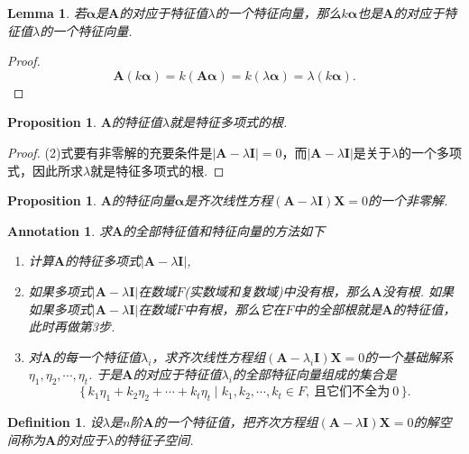 \documentclass{article}
\newtheorem{lemma}[theorem]{Lemma}
\newtheorem{proposition}[theorem]{Proposition}
\newtheorem{definition}[theorem]{Definition}
\newtheorem{annotation}[theorem]{Annotation}
\newcommand\Set[2]{\{\,#1\mid#2\,\}} %
\newcommand{\mbf}[1]{\bm{#1}}
\begin{document}
\begin{lemma}
\rm 若$\mbf{\alpha}$是$\mbf{A}$的对应于特征值$\lambda$的一个特征向量，那么$k\mbf{\alpha}$也是$\mbf{A}$的对应于特征值$\lambda$的一个特征向量. 
\end{lemma}

\begin{proof}
$$
\mbf{A}(k\mbf{\alpha}) = k(\mbf{A}\mbf{\alpha}) = k(\lambda\mbf{\alpha}) = \lambda(k\mbf{\alpha}).
$$
\end{proof}


\begin{proposition}
\rm $\mbf{A}$的特征值$\lambda$就是特征多项式的根.
\end{proposition}

\begin{proof}
\rm (2)式要有非零解的充要条件是$|\mbf{A}-\lambda\mbf{I}| = 0$，而$|\mbf{A}-\lambda\mbf{I}|$是关于$\lambda$的一个多项式，因此所求$\lambda$就是特征多项式的根.
\end{proof}

\begin{proposition}
\rm $\mbf{A}$的特征向量$\mbf{\alpha}$是齐次线性方程$(\mbf{A}-\lambda\mbf{I})\mbf{X} = 0$的一个非零解.
\end{proposition}

\begin{annotation}
\rm 求$\mbf{A}$的全部特征值和特征向量的方法如下
\begin{enumerate}
	\item 计算$\mbf{A}$的特征多项式$|\mbf{A}-\lambda\mbf{I}|$,
	\item 如果多项式$|\mbf{A}-\lambda\mbf{I}|$在数域$F$(实数域和复数域)中没有根，那么$\mbf{A}$没有根. 如果 如果多项式$|\mbf{A}-\lambda\mbf{I}|$在数域$F$中有根，那么它在$F$中的全部根就是$\mbf{A}$的特征值，此时再做第3步.
	\item 对$\mbf{A}$的每一个特征值$\lambda_i$，求齐次线性方程组$(\mbf{A}-\lambda_i\mbf{I})\mbf{X} = 0$的一个基础解系$\eta_1,\eta_2,\cdots,\eta_t$. 于是$\mbf{A}$的对应于特征值$\lambda_i$的全部特征向量组成的集合是
$$
\Set{k_1\eta_1 + k_2\eta_2 + \cdots + k_t\eta_t}{k_1,k_2,\cdots,k_t \in F, ~\text{且它们不全为}~0}.
$$
\end{enumerate}
\end{annotation}

\begin{definition}
\rm 设$\lambda$是$n$阶$\mbf{A}$的一个特征值，把齐次方程组$(\mbf{A}-\lambda\mbf{I})\mbf{X} = 0$的解空间称为$\mbf{A}$的对应于$\lambda$的特征子空间.
\end{definition}
\end{document}
